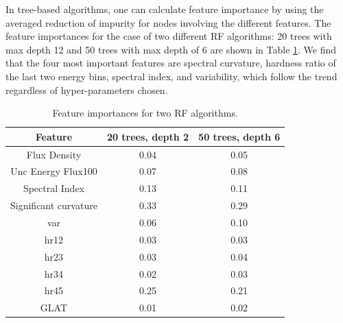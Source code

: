 In tree-based algorithms, one can calculate feature importance by using the averaged reduction of impurity for nodes involving the different features. The feature importances for the case of two different RF algorithms: 20 trees with max depth 12 and 50 trees with max depth of 6 are shown in Table \ref{tab:feat_imp}.
We find that the four most important features are spectral curvature, hardness ratio of the last two energy bins, spectral index, and variability, which follow the trend regardless of hyper-parameters chosen.


\begin{table}[!h]
    \tiny
    \centering
    \renewcommand{\tabcolsep}{1mm}
\renewcommand{\arraystretch}{1}

    \begin{tabular}{|c|c|c|}
    \hline
    Feature &  20 trees, depth 2& 50 trees, depth 6\\
    \hline
    Flux Density& 0.04 & 0.05        \\
    \hline
    Unc Energy Flux100& 0.07     & 0.08 \\
    \hline %
   Spectral Index & 0.13     &   0.11\\
    \hline %
    Significant curvature& 0.33 &0.29  \\
    \hline
   var&  0.06   &  0.10  \\
    \hline %
    hr12& 0.03 &0.03 \\
    \hline
     hr23& 0.03 &0.04 \\
    \hline
    hr34& 0.02 &0.03 \\
    \hline
   hr45& 0.25 &0.21 \\
    \hline
    GLAT&0.01&0.02\\
    \hline
    \end{tabular}
    \vspace{0.4cm}
    \caption{Feature importances for two RF algorithms.}
    \label{tab:feat_imp}
\end{table}


